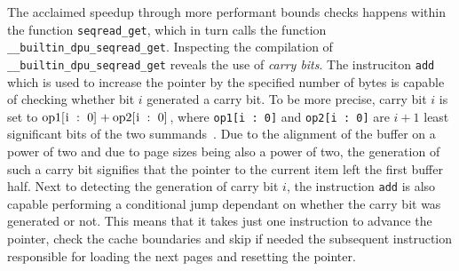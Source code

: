 The acclaimed speedup through more performant bounds checks happens within the function \lstinline|seqread_get|, which in turn calls the function \lstinline|__builtin_dpu_seqread_get|.
Inspecting the compilation of \lstinline|__builtin_dpu_seqread_get| reveals the use of \emph{carry bits}.
The instruciton \lstinline|add| which is used to increase the pointer by the specified number of bytes is capable of checking whether bit \(i\) generated a carry bit.
To be more precise, carry bit \(i\) is set to \(\text{\lstinline|op1[i : 0]|} + \text{\lstinline|op2[i : 0]|}\), where \lstinline|op1[i : 0]| and \lstinline|op2[i : 0]| are \(i + 1\) least significant bits of the two summands~\cite[DPU Handbook -- Specific Conditions Common To Addition and Subtraction]{upmemSDK}.
Due to the alignment of the buffer on a power of two and due to page sizes being also a power of two, the generation of such a carry bit signifies that the pointer to the current item left the first buffer half.
Next to detecting the generation of carry bit \(i\), the instruction \lstinline|add| is also capable performing a conditional jump dependant on whether the carry bit was generated or not.
This means that it takes just one instruction to advance the pointer, check the cache boundaries and skip \Dash if needed \Dash the subsequent instruction responsible for loading the next pages and resetting the pointer.

